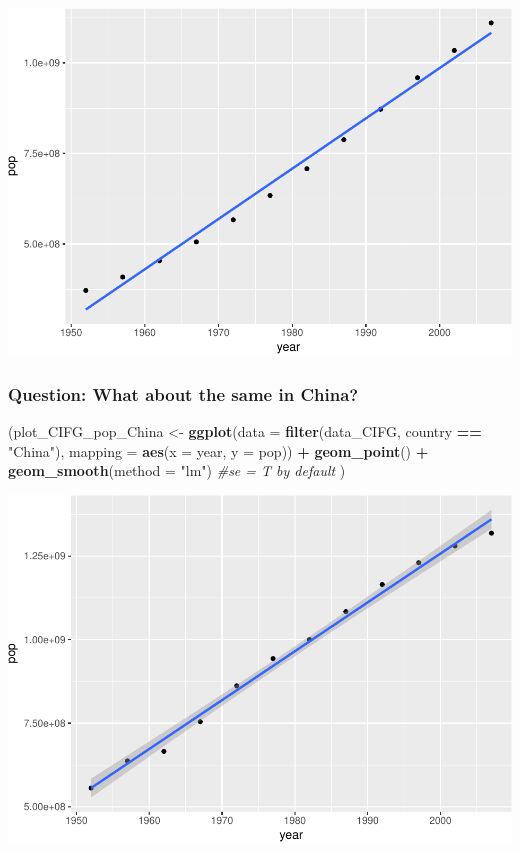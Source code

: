 \documentclass[11pt,]{article}
\newenvironment{Shaded}{\begin{snugshade}}{\end{snugshade}}
\newcommand{\KeywordTok}[1]{\textcolor[rgb]{0.13,0.29,0.53}{\textbf{#1}}}
\newcommand{\DataTypeTok}[1]{\textcolor[rgb]{0.13,0.29,0.53}{#1}}
\newcommand{\StringTok}[1]{\textcolor[rgb]{0.31,0.60,0.02}{#1}}
\newcommand{\CommentTok}[1]{\textcolor[rgb]{0.56,0.35,0.01}{\textit{#1}}}
\newcommand{\OperatorTok}[1]{\textcolor[rgb]{0.81,0.36,0.00}{\textbf{#1}}}
\newcommand{\NormalTok}[1]{#1}
\begin{document}
\includegraphics{Intro_graphics_files/figure-latex/CIFG_pop_Ind-1.pdf}

\subsubsection{Question: What about the same in
China?}\label{question-what-about-the-same-in-china}

\begin{Shaded}
\begin{Highlighting}[]
\NormalTok{(plot_CIFG_pop_China <-}\StringTok{ }\KeywordTok{ggplot}\NormalTok{(}\DataTypeTok{data =} \KeywordTok{filter}\NormalTok{(data_CIFG, }
\NormalTok{                                             country }\OperatorTok{==}\StringTok{ "China"}\NormalTok{), }
                         \DataTypeTok{mapping =} \KeywordTok{aes}\NormalTok{(}\DataTypeTok{x =}\NormalTok{ year, }\DataTypeTok{y =}\NormalTok{ pop)) }\OperatorTok{+}
\StringTok{  }\KeywordTok{geom_point}\NormalTok{() }\OperatorTok{+}
\StringTok{  }\KeywordTok{geom_smooth}\NormalTok{(}\DataTypeTok{method =} \StringTok{"lm"}\NormalTok{) }\CommentTok{#se = T by default}
\NormalTok{ )}
\end{Highlighting}
\end{Shaded}

\includegraphics{Intro_graphics_files/figure-latex/CIFG_pop_China-1.pdf}
\end{document}
